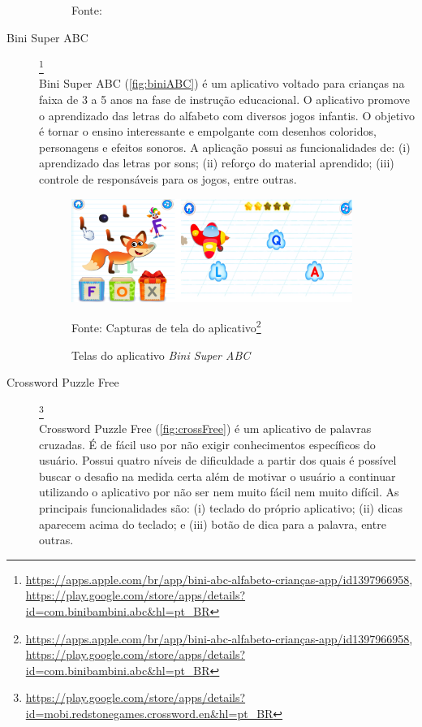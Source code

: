 \begin{description}
\begin{figure}[ht!]
    Fonte: \cite{HumanAnatomyAtlas}
\end{figure}

\item[Bini Super ABC]\footnote{\url{https://apps.apple.com/br/app/bini-abc-alfabeto-crianças-app/id1397966958}, \url{https://play.google.com/store/apps/details?id=com.binibambini.abc&hl=pt_BR}} \hfill \\
Bini Super ABC (\autoref{fig:biniABC}) é um aplicativo voltado para crianças na faixa de 3 a 5 anos na fase de instrução educacional. O aplicativo promove o aprendizado das letras do alfabeto com diversos jogos infantis. O objetivo é tornar o ensino interessante e empolgante com desenhos coloridos, personagens e efeitos sonoros. A aplicação possui as funcionalidades de: (i) aprendizado das letras por sons; (ii) reforço do material aprendido; (iii) controle de responsáveis para os jogos, entre outras.

\begin{figure}[H]
\centering
    \caption{Telas do aplicativo \textit{Bini Super ABC}}
    \label{fig:biniABC}
    \includegraphics[width=0.9\textwidth]{Figuras/biniabc.png}
    
    Fonte: Capturas de tela do aplicativo\footnote{\url{https://apps.apple.com/br/app/bini-abc-alfabeto-crianças-app/id1397966958}, \url{https://play.google.com/store/apps/details?id=com.binibambini.abc&hl=pt_BR}}
\end{figure}

\item[Crossword Puzzle Free]\footnote{\url{https://play.google.com/store/apps/details?id=mobi.redstonegames.crossword.en&hl=pt_BR}} \hfill \\
Crossword Puzzle Free (\autoref{fig:crossFree}) é um aplicativo de palavras cruzadas. É de fácil  uso por não exigir conhecimentos específicos do usuário. Possui quatro níveis de dificuldade a partir dos quais é possível buscar o desafio na medida certa além de motivar o usuário a continuar utilizando o aplicativo por não ser nem muito fácil nem muito difícil. As principais funcionalidades são: (i) teclado do próprio aplicativo; (ii) dicas aparecem acima do teclado; e (iii) botão de dica para a palavra, entre outras.



\end{description}
